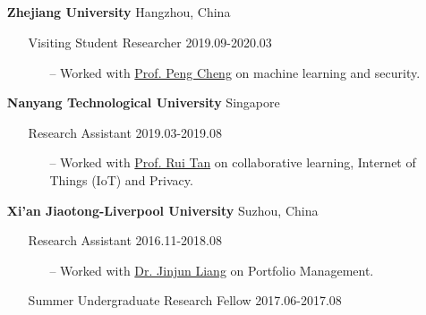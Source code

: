 \documentclass[11pt]{article}
\begin{document}
\subsection*{}
\begin{itemize}[leftmargin=0em, noitemsep, nolistsep]
    \setlength\itemsep{1em}
    \item[] \large\textbf{Zhejiang University} \hfill Hangzhou, China
        \begin{itemize}[noitemsep, nolistsep, leftmargin=0em]
            \item[] {Visiting Student Researcher} \hfill 2019.09-2020.03
             \begin{itemize}
                \small
                \item[--] Worked with \href{https://person.zju.edu.cn/en/cp}{Prof. Peng Cheng} on machine learning and security.
             \end{itemize}
        \end{itemize} 
    \item[] \large\textbf{Nanyang Technological University} \hfill Singapore
        \begin{itemize}[noitemsep, nolistsep, leftmargin=0em]
            \item[] Research Assistant \hfill 2019.03-2019.08
             \begin{itemize}
                \small
                \item[--] Worked with \href{https://www.ntu.edu.sg/home/tanrui/}{Prof. Rui Tan} on collaborative learning, Internet of Things (IoT) and Privacy.
             \end{itemize}
        \end{itemize} 
    \item[] \large\textbf{Xi'an Jiaotong-Liverpool University} \hfill Suzhou, China
        \begin{itemize}[noitemsep, nolistsep, leftmargin=0em]
            \item[] Research Assistant \hfill 2016.11-2018.08
             \begin{itemize}
                \small
                \item[--] Worked with \href{https://www.linkedin.com/in/kumkee}{Dr. Jinjun Liang} on Portfolio Management.
             \end{itemize}
            \item[] Summer Undergraduate Research Fellow \hfill 2017.06-2017.08
             \begin{itemize}

\end{itemize}
\end{itemize}
\end{itemize}
\end{document}
